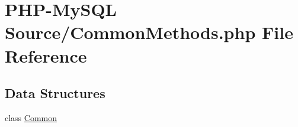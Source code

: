 \hypertarget{_common_methods_8php}{}\section{P\+H\+P-\/\+My\+S\+QL Source/\+Common\+Methods.php File Reference}
\label{_common_methods_8php}
\subsection*{Data Structures}
\begin{DoxyCompactItemize}
\item 
class \hyperlink{class_common}{Common}
\end{DoxyCompactItemize}
